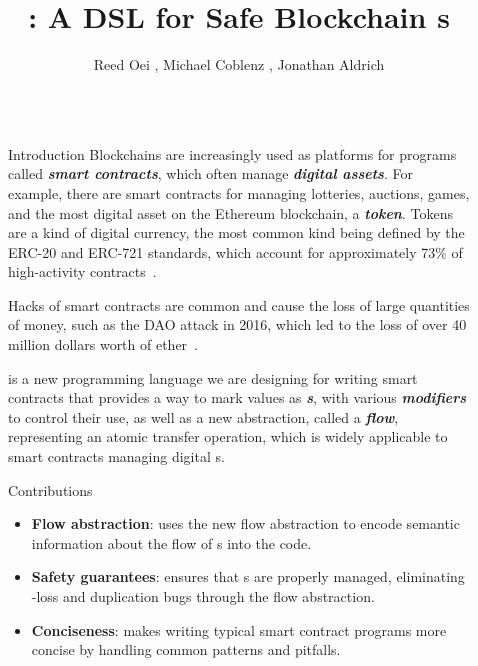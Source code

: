 \documentclass[usenames, dvipsnames, final]{beamer}
\title{\langName: A DSL for Safe Blockchain \AssetTxt{}s}
\author{Reed Oei \inst{1}, Michael Coblenz \inst{2}, Jonathan Aldrich \inst{2}}
\institute[shortinst]{\inst{1} University of Illinois \samelineand \inst{2} Carnegie Mellon University}
\newlength{\sepwidth}
\newlength{\colwidth}
\newcommand{\separatorcolumn}{\begin{column}{\sepwidth}\end{column}}
\newcommand{\term}[1]{\textbf{\emph{#1}}}
\begin{document}
\begin{frame}[t]
\begin{columns}[t]
\separatorcolumn

\begin{column}{\colwidth}

  \begin{block}{Introduction}
      Blockchains are increasingly used as platforms for programs called \term{smart contracts}, which often manage \term{digital assets}.
      For example, there are smart contracts for managing lotteries, auctions, games, and the most digital asset on the Ethereum blockchain, a \term{token}.
      Tokens are a kind of digital currency, the most common kind being defined by the ERC-20 and ERC-721 standards, which account for approximately 73\% of high-activity contracts~\cite{OlivaEtAl2019}.

      Hacks of smart contracts are common and cause the loss of large quantities of money, such as the DAO attack in 2016, which led to the loss of over 40 million dollars worth of ether~\cite{DAO}.

      \textcolor{softRed}{\textbf{\langName}} is a new programming language we are designing for writing smart contracts that provides a way to mark values as \term{\assetTxt{}s}, with various \term{modifiers} to control their use, as well as a new abstraction, called a \term{flow}, representing an atomic transfer operation, which is widely applicable to smart contracts managing digital \assetTxt{}s.
  \end{block}

    \begin{alertblock}{Contributions}
      \begin{itemize}
          \item \textbf{Flow abstraction}: \langName uses the new flow abstraction to encode semantic information about the flow of \assetTxt{}s into the code.
          \item \textbf{Safety guarantees}: \langName ensures that \assetTxt{}s are properly managed, eliminating \assetTxt-loss and duplication bugs through the flow abstraction.
          \item \textbf{Conciseness}: \langName makes writing typical smart contract programs more concise by handling common patterns and pitfalls.
      \end{itemize}
    \end{alertblock}
\end{column}

\separatorcolumn


\end{columns}
\end{frame}
\end{document}
